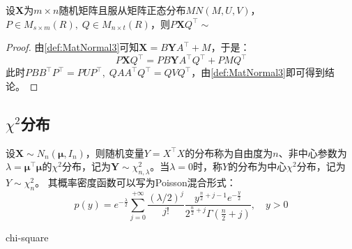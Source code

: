 \begin{theorem}\label{theo:MatNormalLinearTransform}
	设$\mathbf{X}$为$m\times n$随机矩阵且服从矩阵正态分布$MN(M,U,V)$，$P\in M_{s\times m}(R),\;Q\in M_{n\times t}(R)$，则$P\mathbf{X}Q^{\top}\sim$
\end{theorem}
\begin{proof}
	由\cref{def:MatNormal3}可知$\mathbf{X}=B\mathbf{Y}A^{\top}+M$，于是：
	\begin{equation*}
		P\mathbf{X}Q^{\top}=PB\mathbf{Y}A^{\top}Q^{\top}+PMQ^{\top}
	\end{equation*}
	此时$PBB^{\top}P^{\top}=PUP^{\top},\;QAA^{\top}Q^{\top}=QVQ^{\top}$，由\cref{def:MatNormal3}即可得到结论。
\end{proof}

\subsection{$\chi^2$分布}
\begin{definition}
	设$\mathbf{X}\sim N_n(\boldsymbol{\mu}, I_n)$，则随机变量$Y=X^{\top}X$的分布称为自由度为$n$、非中心参数为$\lambda=\boldsymbol{\mu}^{\top}\boldsymbol{\mu}$的$\chi^2$分布，记为$\mathbf{Y}\sim \chi^2_{n,\lambda}$。当$\lambda=0$时，称$Y$的分布为中心$\chi^2$分布，记为$Y\sim\chi_n^2$。
	其概率密度函数可以写为Poisson混合形式：
	\begin{equation*}
		p(y)=e^{-\frac{\lambda}{2}}\sum_{j=0}^{+\infty}\frac{(\lambda/2)^j}{j!}
		\frac{y^{\frac{n}{2}+j-1}e^{-\frac{y}{2}}}{2^{\frac{n}{2}+j}\Gamma\left(\frac{n}{2}+j\right)},\quad y>0
	\end{equation*}
\end{definition}
\begin{densityplot}{chi-square}
	\caption{中心 $\chi^2$ 分布 $\chi^2_{4,0}$ 的概率密度函数}
\end{densityplot}
